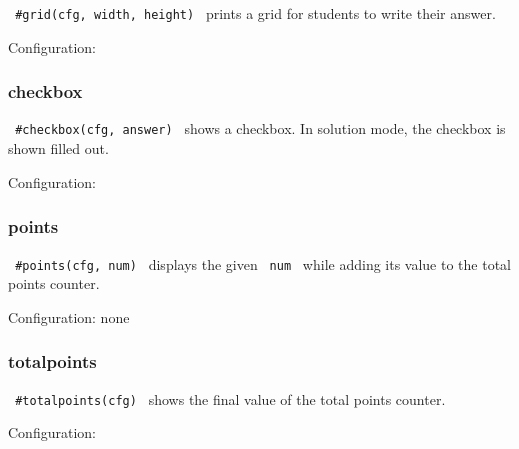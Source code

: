 \texttt{\ \#grid(cfg,\ width,\ height)\ } prints a grid for students to
write their answer.

Configuration:

\begin{Shaded}
\begin{Highlighting}[]
\end{Highlighting}
\end{Shaded}

\subsubsection{checkbox}\label{checkbox}

\texttt{\ \#checkbox(cfg,\ answer)\ } shows a checkbox. In solution
mode, the checkbox is shown filled out.

Configuration:

\begin{Shaded}
\begin{Highlighting}[]
\end{Highlighting}
\end{Shaded}

\subsubsection{points}\label{points}

\texttt{\ \#points(cfg,\ num)\ } displays the given \texttt{\ num\ }
while adding its value to the total points counter.

Configuration: none

\subsubsection{totalpoints}\label{totalpoints}

\texttt{\ \#totalpoints(cfg)\ } shows the final value of the total
points counter.

Configuration:

\begin{Shaded}
\begin{Highlighting}[]
\end{Highlighting}
\end{Shaded}

